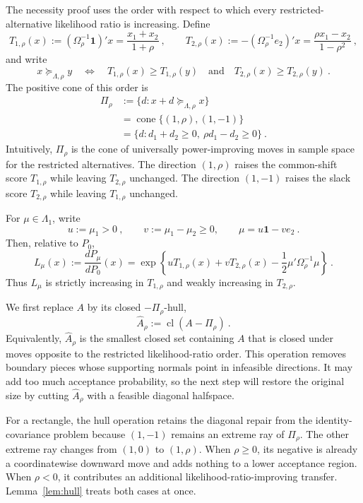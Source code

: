 \documentclass[12pt]{article}
\theoremstyle{remark}
\begin{document}
The necessity proof uses the order with respect to which every
restricted-alternative likelihood ratio is increasing.  Define
\[
T_{1,\rho}(x):=(\Omega_\rho^{-1}\mathbf 1)'x
=\frac{x_1+x_2}{1+\rho}~,
\qquad
T_{2,\rho}(x):=-(\Omega_\rho^{-1}e_2)'x
=\frac{\rho x_1-x_2}{1-\rho^2}~,
\]
and write
\[
x\succeq_{\Lambda,\rho}y
\quad\Longleftrightarrow\quad
T_{1,\rho}(x)\ge T_{1,\rho}(y)
\quad\text{and}\quad
T_{2,\rho}(x)\ge T_{2,\rho}(y)~.
\]
The positive cone of this order is
\begin{equation}\label{eq:transfer-cone}
\begin{split}
\Pi_\rho
&:=\{d:x+d\succeq_{\Lambda,\rho}x\}\\
&=\operatorname{cone}\{(1,\rho),(1,-1)\}\\
&=\{d:d_1+d_2\ge0,\ \rho d_1-d_2\ge0\}~.
\end{split}
\end{equation}
Intuitively, $\Pi_\rho$ is the cone of universally power-improving moves in
sample space for the restricted alternatives.  The direction $(1,\rho)$ raises
the common-shift score $T_{1,\rho}$ while leaving $T_{2,\rho}$ unchanged.  The
direction $(1,-1)$ raises the slack score $T_{2,\rho}$ while leaving
$T_{1,\rho}$ unchanged.

For $\mu\in\Lambda_1$, write
\[
u:=\mu_1>0~,
\qquad
v:=\mu_1-\mu_2\ge0,
\qquad
\mu=u\mathbf 1-ve_2~.
\]
Then, relative to $P_0$,
\begin{equation}\label{eq:LR-density}
L_\mu(x):=\frac{dP_\mu}{dP_0}(x)
=\exp\left\{uT_{1,\rho}(x)+vT_{2,\rho}(x)
-\frac12\mu'\Omega_\rho^{-1}\mu\right\}~.
\end{equation}
Thus $L_\mu$ is strictly increasing in $T_{1,\rho}$ and weakly increasing in
$T_{2,\rho}$.

We first replace $A$ by its closed $-\Pi_\rho$-hull,
\[
\widehat A_\rho:=\operatorname{cl}(A-\Pi_\rho)~.
\]
Equivalently, $\widehat A_\rho$ is the smallest closed set containing $A$ that
is closed under moves opposite to the restricted likelihood-ratio order.  This
operation removes boundary pieces whose supporting normals point in infeasible
directions.  It may add too much acceptance probability, so the next step will
restore the original size by cutting $\widehat A_\rho$ with a feasible diagonal
halfspace.

For a rectangle, the hull operation retains the diagonal repair from the
identity-covariance problem because $(1,-1)$ remains an extreme ray of
$\Pi_\rho$.  The other extreme ray changes from $(1,0)$ to $(1,\rho)$.  When
$\rho\ge0$, its negative is already a coordinatewise downward move and adds
nothing to a lower acceptance region.  When $\rho<0$, it contributes an
additional likelihood-ratio-improving transfer.  Lemma~\ref{lem:hull} treats
both cases at once.
\end{document}
